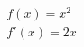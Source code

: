 \documentclass[preview]{standalone}
\begin{document}
\begin{align*}
f(x) = x^2 \\ f'(x) = 2x
\end{align*}
\end{document}
